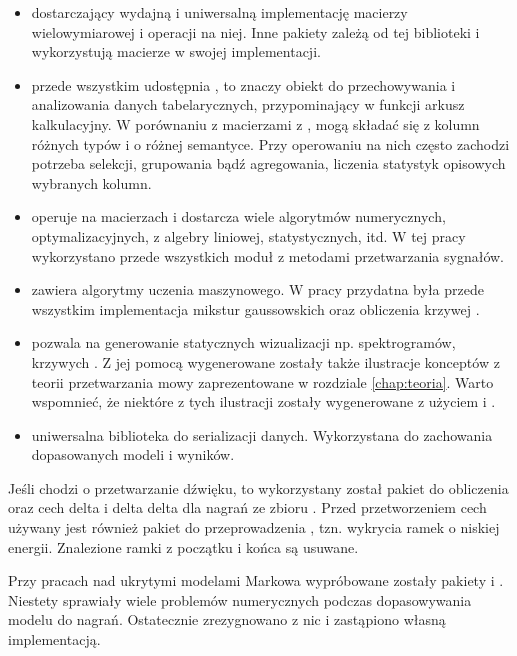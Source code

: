 \begin{itemize}
    \item {} dostarczający wydajną i uniwersalną implementację macierzy wielowymiarowej i operacji na niej.
        Inne pakiety zależą od tej biblioteki i wykorzystują macierze w swojej implementacji.
    \item {} przede wszystkim udostępnia , to znaczy obiekt do przechowywania i analizowania danych tabelarycznych, przypominający w funkcji arkusz kalkulacyjny. W porównaniu z macierzami z ,  mogą składać się z kolumn różnych typów i o różnej semantyce. Przy operowaniu na nich często zachodzi potrzeba selekcji, grupowania bądź agregowania, liczenia statystyk opisowych wybranych kolumn.
    \item {} operuje na macierzach  i dostarcza wiele algorytmów numerycznych, optymalizacyjnych, z algebry liniowej, statystycznych, itd. W tej pracy wykorzystano przede wszystkich moduł z metodami przetwarzania sygnałów.
    \item {} zawiera algorytmy uczenia maszynowego. W pracy przydatna była przede wszystkim implementacja mikstur gaussowskich oraz obliczenia krzywej .
    \item {} pozwala na generowanie statycznych wizualizacji np. spektrogramów, krzywych . Z jej pomocą wygenerowane zostały także ilustracje konceptów z teorii przetwarzania mowy zaprezentowane w rozdziale \ref{chap:teoria}. Warto wspomnieć, że niektóre z tych ilustracji zostały wygenerowane z użyciem  i .
    \item {} uniwersalna biblioteka do serializacji danych. Wykorzystana do zachowania dopasowanych modeli i wyników.
\end{itemize}

Jeśli chodzi o przetwarzanie dźwięku, to wykorzystany został pakiet 
do obliczenia  oraz cech delta i delta delta dla nagrań ze zbioru .
Przed przetworzeniem cech używany jest również pakiet  do przeprowadzenia
, tzn. wykrycia ramek o niskiej energii.  Znalezione ramki z początku i końca są usuwane.

Przy pracach nad ukrytymi modelami Markowa wypróbowane zostały pakiety  i .
Niestety sprawiały wiele problemów numerycznych podczas dopasowywania modelu do nagrań. Ostatecznie zrezygnowano z nic
i zastąpiono własną implementacją.

